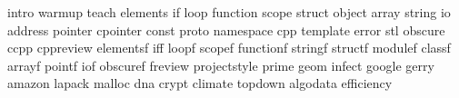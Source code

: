 intro
warmup
teach
elements
if
loop
function
scope
struct
object
array
string
io
address
pointer
cpointer
const
proto
namespace
cpp
template
error
stl
obscure
ccpp
cppreview
elementsf
iff
loopf
scopef
functionf
stringf
structf
modulef
classf
arrayf
pointf
iof
obscuref
freview
projectstyle
prime
geom
infect
google
gerry
amazon
lapack
malloc
dna
crypt
climate
topdown
algodata
efficiency
